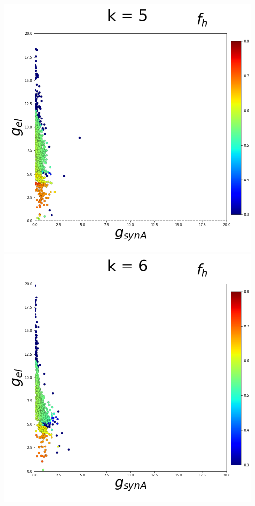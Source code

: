 \documentclass[11pt]{article}
\begin{document}
\begin{center}
\includegraphics[scale=0.125]{DSN_figs/STGCircuit_DSN_c=2_rs=4_k=5.png}
\includegraphics[scale=0.125]{DSN_figs/STGCircuit_DSN_c=2_rs=4_k=6.png}

\end{center}
\end{document}
